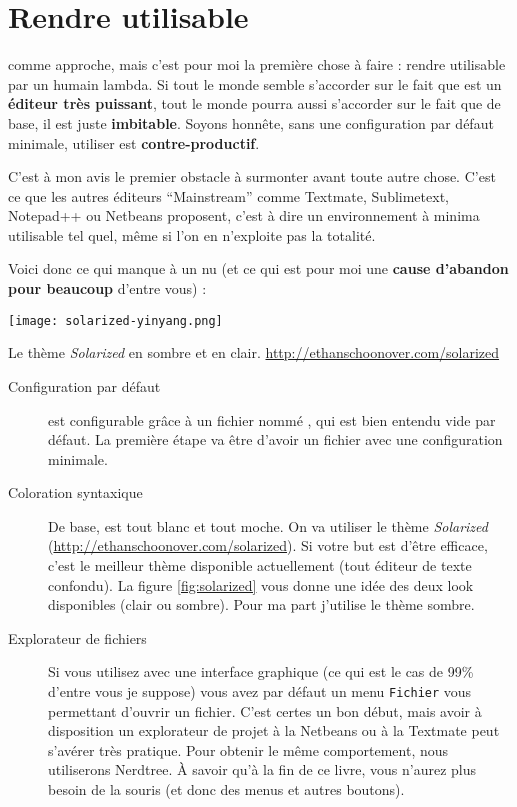 \chapter{Rendre \vim utilisable}

 comme approche, mais c'est pour moi la première chose à faire : rendre \vim utilisable par un humain lambda. Si tout le monde semble s'accorder sur le fait que \vim est un \textbf{éditeur très puissant}, tout le monde pourra aussi s'accorder sur le fait que de base, il est juste \textbf{imbitable}. Soyons honnête, sans une configuration par défaut minimale, utiliser \vim est \textbf{contre-productif}. 

C'est à mon avis le premier obstacle à surmonter avant toute autre chose. C'est ce que les autres éditeurs ``Mainstream'' comme Textmate, Sublimetext, Notepad++ ou Netbeans proposent, c'est à dire un environnement à minima utilisable tel quel, même si l'on en n'exploite pas la totalité.

Voici donc ce qui manque à un \vim nu (et ce qui est pour moi une \textbf{cause d'abandon pour beaucoup} d'entre vous) :

\begin{marginfigure}%
  \texttt{[image: solarized-yinyang.png]}
  \caption{Le thème \emph{Solarized} en sombre et en clair. \url{http://ethanschoonover.com/solarized}}
  \label{fig:solarized}
\end{marginfigure}

\begin{description}
    \item[Configuration par défaut] \vim est configurable grâce à un fichier nommé \vimrc, qui est bien entendu vide par défaut. La première étape va être d'avoir un fichier \vimrc avec une configuration minimale.
    \item[Coloration syntaxique] De base, \vim est tout blanc et tout moche. On va utiliser le thème \emph{Solarized} (\url{http://ethanschoonover.com/solarized}). Si votre but est d'être efficace, c'est le meilleur thème disponible actuellement (tout éditeur de texte confondu). La figure \ref{fig:solarized} vous donne une idée des deux look disponibles (clair ou sombre). Pour ma part j'utilise le thème sombre.
    \item[Explorateur de fichiers] Si vous utilisez \vim avec une interface graphique (ce qui est le cas de 99\% d'entre vous je suppose) vous avez par défaut un menu \Verb|Fichier| vous permettant d'ouvrir un fichier. C'est certes un bon début, mais avoir à disposition un explorateur de projet à la Netbeans ou à la Textmate peut s'avérer très pratique. Pour obtenir le même comportement, nous utiliserons Nerdtree. À savoir qu'à la fin de ce livre, vous n'aurez plus besoin de la souris (et donc des menus et autres boutons).
\end{description}

